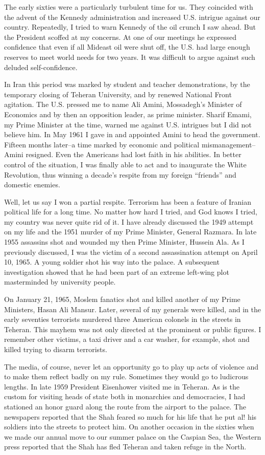 The early sixties were a particularly turbulent time for us. They coincided with the advent of the Kennedy administration and increased U.S. intrigue against our country. Repeatedly, I tried to warn Kennedy of the oil crunch I saw ahead. But the President scoffed at my concerns. At one of our meetings he expressed confidence that even if all Mideast oil were shut off, the U.S. had large enough reserves to meet world needs for two years. It was difficult to argue against such deluded self-confidence. 

In Iran this period was marked by student and teacher demonstrations, by the temporary closing of Teheran University, and by renewed National Front agitation. The U.S. pressed me to name Ali Amini, Mossadegh's Minister of Economics and by then an opposition leader, as prime minister. Sharif Emami, my Prime Minister at the time, warned me against U.S. intrigues but I did not believe him. In May 1961 I gave in and appointed Amini to head the government. Fifteen months later--a time marked by economic and political mismanagement--Amini resigned. Even the Americans had lost faith in his abilities. In better control of the situation, I was finally able to act and to inaugurate the White Revolution, thus winning a decade's respite from my foreign “friends” and domestic enemies. 

Well, let us say I won a partial respite. Terrorism has been a feature of Iranian political life for a long time. No matter how hard I tried, and God knows I tried, my country was never quite rid of it. I have already discussed the 1949 attempt on my life and the 1951 murder of my Prime Minister, General Razmara. In late 1955 assassins shot and wounded my then Prime Minister, Hussein Ala. As I previously discussed, I was the victim of a second assassination attempt on April 10, 1965. A young soldier shot his way into the palace. A subsequent investigation showed that he had been part of an extreme left-wing plot masterminded by university people. 

On January 21, 1965, Moslem fanatics shot and killed another of my Prime Ministers, Hasan Ali Mansur. Later, several of my generals were killed, and in the early seventies terrorists murdered three American colonels in the streets in Teheran. This mayhem was not only directed at the prominent or public figures. I remember other victims, a taxi driver and a car washer, for example, shot and killed trying to disarm terrorists. 

The media, of course, never let an opportunity go to play up acts of violence and to make them reflect badly on my rule. Sometimes they would go to ludicrous lengths. In late 1959 President Eisenhower visited me in Teheran. As is the custom for visiting heads of state both in monarchies and democracies, I had stationed an honor guard along the route from the airport to the palace. The newspapers reported that the Shah feared so much for his life that he put al! his soldiers into the streets to protect him. On another occasion in the sixties when we made our annual move to our summer palace on the Caspian Sea, the Western press reported that the Shah has fled Teheran and taken refuge in the North. 

